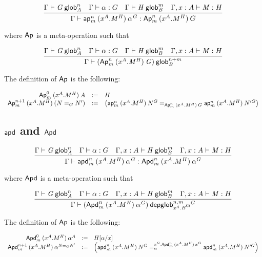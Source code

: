 \begin{small}
  \[\infer{\ofglob{\Gamma}{\apnm{n}{m}{(x^A.M^H)}{\alpha^G}}
    {\Apnm{n}{m}{(x^A.M^H)}{G}}}
  {\wfglob{\Gamma}{G}{n}{A}
    & \ofglob{\Gamma}{\alpha}{G}
    & \wfglob{\Gamma}{H}{m}{B}
    & \ofglob{\Gamma,x:A}{M}{H}}\]

  where $\dsd{Ap}$ is a meta-operation such that

  \[\infer{\wfglob{\Gamma}{(\Apnm{n}{m}{(x^A.M^H)}{G})}{n+m}
    {B}}
  {\wfglob{\Gamma}{G}{n}{A}
    & \ofglob{\Gamma}{\alpha}{G}
    & \wfglob{\Gamma}{H}{m}{B}
    & \ofglob{\Gamma,x:A}{M}{H}}\]

  The definition of $\dsd{Ap}$ is the following:

  \[
  \begin{array}{rcl}
    \Apnm{0}{m}{(x^A.M^H)}{A} & := & H \\
    \Apnm{n+1}{m}{(x^A.M^H)}{(\homj{G}{N}{N'})} & := & \left(
      \homj{\Apnm{n}{m}{(x^A.M^H)}{G}}
      {\apnm{n}{m}{(x^A.M^H)}{N^G}}{\apnm{n}{m}{(x^A.M^H)}{N'^G}}\right)
  \end{array}
  \]
\end{small}

\subsection{$\dsd{apd}$ and $\dsd{Apd}$}

\begin{small}
  \[\infer{\ofglob{\Gamma}{\apdnm{n}{m}{(x^A.M^H)}{\alpha^G}}
    {\Apdnm{n}{m}{(x^A.M^H)}{\alpha^G}}}
  {\wfglob{\Gamma}{G}{n}{A}
    & \ofglob{\Gamma}{\alpha}{G}
    & \wfglob{\Gamma,x:A}{H}{m}{B}
    & \ofglob{\Gamma,x:A}{M}{H}}\]

  where $\dsd{Apd}$ is a meta-operation such that

  \[\infer{\wfdepglob{\Gamma}{(\Apdnm{n}{m}{(x^A.M^H)}{\alpha^G})}{n,m}
    {x^A.B}{\alpha^G}}
  {\wfglob{\Gamma}{G}{n}{A}
    & \ofglob{\Gamma}{\alpha}{G}
    & \wfglob{\Gamma,x:A}{H}{m}{B}
    & \ofglob{\Gamma,x:A}{M}{H}}\]

  The definition of $\dsd{Ap}$ is the following:

  \[
  \begin{array}{rcl}
    \Apdnm{0}{m}{(x^A.M^H)}{\alpha^A} & := & H[\alpha/x] \\
    \Apdnm{n+1}{m}{(x^A.M^H)}{\alpha^{\homj{G}{N}{N'}}} & := & \left(
      \dhomj{x^G.\Apdnm{n}{m}{(x^A.M^H)}{x^G}}
      {\apdnm{n}{m}{(x^A.M^H)}{N^G}}{\apdnm{n}{m}{(x^A.M^H)}{N'^G}}{\alpha}\right)
  \end{array}
  \]
\end{small}


